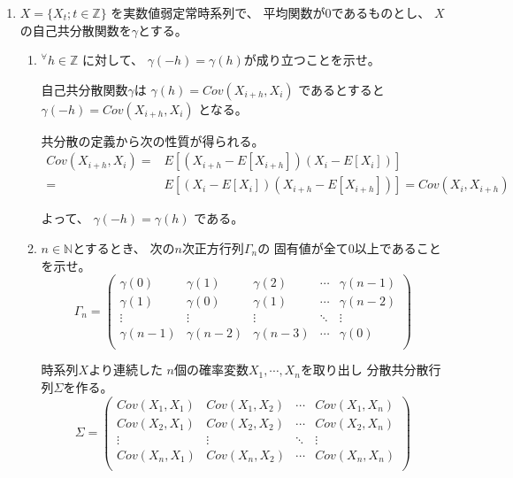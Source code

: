 \documentclass[12pt,b5paper]{ltjsarticle}
\begin{document}
\begin{enumerate}
 \item
      $X=\{X_{t};t\in\mathbb{Z}\}$
      を実数値弱定常時系列で、
      平均関数が$0$であるものとし、
      $X$の自己共分散関数を$\gamma$とする。
      \begin{enumerate}
       \item
            ${}^{\forall}h\in\mathbb{Z}$
            に対して、
            $\gamma(-h)=\gamma(h)$が成り立つことを示せ。

\dotfill

            自己共分散関数$\gamma$は
            $\gamma(h)=Cov(X_{i+h},X_{i})$
            であるとすると
            $\gamma(-h)=Cov(X_{i+h},X_{i})$
            となる。

            共分散の定義から次の性質が得られる。
            \begin{align}
             Cov(X_{i+h},X_{i})
              =& E[(X_{i+h}-E[X_{i+h}])(X_i-E[X_i])]\\
              =& E[(X_{i}-E[X_{i}])(X_{i+h}-E[X_{i+h}])]
              = Cov(X_{i},X_{i+h})
            \end{align}

            よって、
            $\gamma(-h)=\gamma(h)$
            である。

\hrulefill
       \item
            $n\in\mathbb{N}$とするとき、
            次の$n$次正方行列$\Gamma_{n}$の
            固有値が全て$0$以上であることを示せ。
            \begin{equation}
             \Gamma_{n}=
              \begin{pmatrix}
               \gamma(0) & \gamma(1) & \gamma(2) & \cdots & \gamma(n-1)\\
               \gamma(1) & \gamma(0) & \gamma(1) & \cdots & \gamma(n-2)\\
               \vdots & \vdots & \vdots & \ddots & \vdots \\
               \gamma(n-1) & \gamma(n-2) & \gamma(n-3) & \cdots & \gamma(0)\\
              \end{pmatrix}
            \end{equation}
\dotfill


            時系列$X$より連続した
            $n$個の確率変数$X_1,\cdots,X_n$を取り出し
            分散共分散行列$\Sigma$を作る。
            \begin{equation}
             \Sigma =
             \begin{pmatrix}
              Cov(X_1,X_1) & Cov(X_1,X_2) & \cdots & Cov(X_1,X_n)\\
              Cov(X_2,X_1) & Cov(X_2,X_2) & \cdots & Cov(X_2,X_n)\\
              \vdots & \vdots & \ddots & \vdots\\
              Cov(X_n,X_1) & Cov(X_n,X_2) & \cdots & Cov(X_n,X_n)\\
             \end{pmatrix}
            \end{equation}


\end{enumerate}
\end{enumerate}
\end{document}
